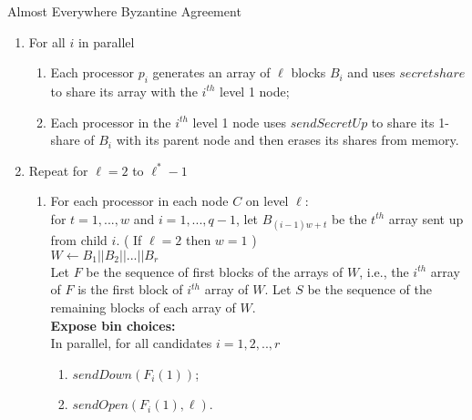 \documentclass[letterpaper,11pt]{article}
\begin{document}
\begin{algorithm} \label{aeBA}
\caption {Almost Everywhere Byzantine Agreement}
\begin{enumerate}
\item
For all $i$ in parallel
\begin{enumerate}
\item
 Each processor $p_i$ generates an array of  $\ell $ blocks  $B_i$ and  uses $secretshare$ to share its array with the $i^{th}$ level 1 node;
\item
Each processor in the $i^{th}$  level 1 node uses  $sendSecretUp$ to share its 1-share of $B_i$ with its parent node
and then erases its shares from memory.  \\
\end{enumerate}
\item
Repeat for $\ell=2$ to $\ell^*-1$\\
\begin{enumerate}
\item
For each processor in each node $C$ on level $\ell$:\\
   for $t=1,...,w$ and $i=1,...,q-1$, let  $B_{(i-1)w+t}$ be the $t^{th}$ array sent up from child $i$. 
( If $\ell =2  $ then $w=1$ ) \\
$W \leftarrow B_1 |  \! | B_2 | \! | ...| \! | B_{r}$  \\

Let $F$ be the sequence of first blocks of the arrays of $W$, i.e., the $i^{th}$ array of $F$ is the first block of $i^{th}$ array of $W$.  Let $S$ be the sequence of the remaining blocks  of each array of $W$.\\

 {\bf Expose bin choices:}\\
In parallel,  for all candidates $i=1, 2,..,r$

 \begin{enumerate}
\item
 $sendDown(F_i(1))$;
  \item
 $sendOpen(F_i(1), \ell)$. \\
\end{enumerate} 


\end{enumerate}
\end{enumerate}
\end{algorithm}
\end{document}
